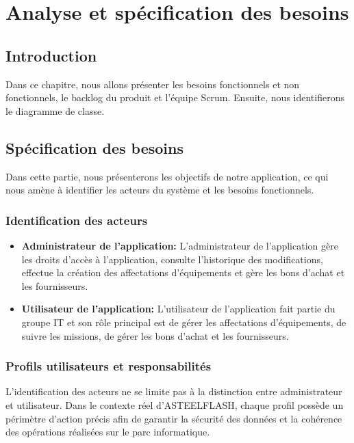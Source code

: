 ﻿
\chapter{Analyse et spécification des besoins}


\section*{Introduction}

Dans ce chapitre, nous allons présenter les besoins fonctionnels et non fonctionnels, le backlog du produit et l'équipe Scrum. Ensuite, nous identifierons le diagramme de classe.
\section{Spécification des besoins} 
Dans cette partie, nous présenterons les objectifs de notre application, ce qui nous amène à identifier les acteurs du système et les besoins fonctionnels.
\subsection{Identification des acteurs}
\begin{itemize}
   

 \item \textbf{Administrateur de l'application: }L'administrateur de l'application gère les droits d'accès à l'application, consulte l'historique des modifications, effectue la création des affectations d'équipements et gère les bons d'achat et les fournisseurs. 
 \item \textbf{Utilisateur de l'application: }L'utilisateur de l'application fait partie du groupe IT et son rôle principal est de gérer les affectations d'équipements, de suivre les missions, de gérer les bons d'achat et les fournisseurs.
 \end{itemize}

\subsection{Profils utilisateurs et responsabilités}

L'identification des acteurs ne se limite pas à la distinction entre administrateur et utilisateur. Dans le contexte réel d'ASTEELFLASH, chaque profil possède un périmètre d'action précis afin de garantir la sécurité des données et la cohérence des opérations réalisées sur le parc informatique.

